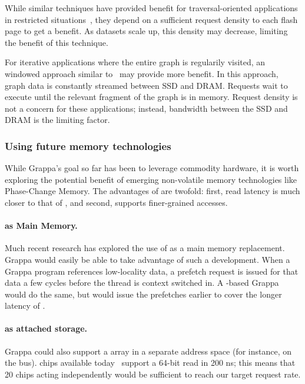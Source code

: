 While similar techniques have provided benefit for traversal-oriented applications in
restricted situations~\cite{magt:2010}, they depend on a sufficient request
density to each flash page to get a benefit. As datasets scale up, this
density may decrease, limiting the benefit of this technique.

For iterative applications where the entire graph is regularily
visited, an windowed approach similar to~\cite{graphchi:osdi12} may
provide more benefit. In this approach, graph data is constantly
streamed between SSD and DRAM. Requests wait to execute until the
relevant fragment of the graph is in memory. Request density is not a
concern for these applications; instead, bandwidth between the SSD and
DRAM is the limiting factor.

\subsubsection{Using future memory technologies}

While Grappa's goal so far has been to leverage commodity hardware, it
is worth exploring the potential benefit of emerging non-volatile
memory technologies like Phase-Change Memory. The advantages of 
are twofold: first, read latency is much closer to that of , and
second,  supports finer-grained accesses.

\paragraph{ as Main Memory.}
Much recent research has explored the use of  as a main memory
replacement. Grappa would easily be able to take advantage of such a
development. When a Grappa program references low-locality data,
a prefetch request is issued for that data a few cycles before the
thread is context switched in. A -based
Grappa would do the same, but would issue the prefetches earlier to
cover the longer latency of .

\paragraph{ as attached storage.}
Grappa could also support a  array in a separate address space (for
instance, on the  bus).  chips available today~\cite{micronPCM} support a
64-bit read in 200 ns; this means that 20 chips acting independently
would be sufficient to reach our target request rate.

